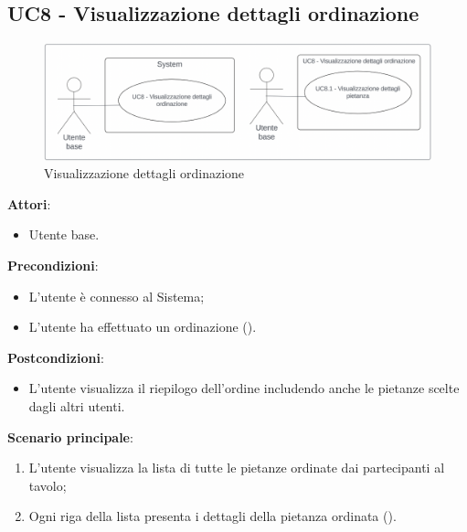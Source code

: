 \subsection{UC8 - Visualizzazione dettagli ordinazione}\label{usecase:8}
\begin{figure}[H]
    \centering
    \includegraphics[width=0.9\linewidth]{ucd/ucd8_new.png}
    \caption{Visualizzazione dettagli ordinazione}
\end{figure}
\textbf{Attori}:
\begin{itemize}
    \item Utente base.
\end{itemize}
\textbf{Precondizioni}:
\begin{itemize}
    \item L'utente è connesso al Sistema;
    \item L'utente ha effettuato un ordinazione ().
\end{itemize}
\textbf{Postcondizioni}:
\begin{itemize}
    \item L'utente visualizza il riepilogo dell'ordine includendo anche le pietanze scelte dagli altri utenti.
\end{itemize}
\textbf{Scenario principale}:
\begin{enumerate}
    \item L'utente visualizza la lista di tutte le pietanze ordinate dai partecipanti al tavolo;
    \item Ogni riga della lista presenta i dettagli della pietanza ordinata ().
\end{enumerate}
